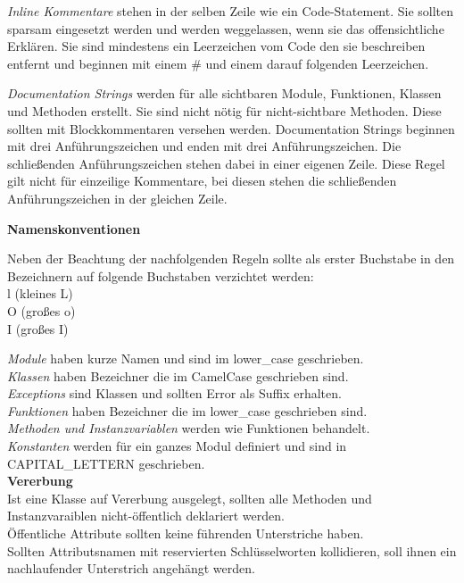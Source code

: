 \textit{Inline Kommentare} stehen in der selben Zeile wie ein Code-Statement. Sie sollten sparsam eingesetzt werden und werden weggelassen, wenn sie das offensichtliche Erklären. Sie sind mindestens ein Leerzeichen vom Code den sie beschreiben entfernt und beginnen mit einem \# und einem darauf folgenden Leerzeichen. 

\textit{Documentation Strings} werden für alle sichtbaren Module, Funktionen, Klassen und Methoden erstellt. Sie sind nicht nötig für nicht-sichtbare Methoden. Diese sollten mit Blockkommentaren versehen werden. Documentation Strings beginnen mit drei Anführungszeichen und enden mit drei Anführungszeichen. Die schließenden Anführungszeichen stehen dabei in einer eigenen Zeile. Diese Regel gilt nicht für einzeilige Kommentare, bei diesen stehen die schließenden Anführungszeichen in der gleichen Zeile.

\textbf{Namenskonventionen}\\
\begin{tabbing}
Neben \= der Beachtung der nachfolgenden Regeln sollte als erster Buchstabe in den \\
Bezeichnern auf folgende Buchstaben verzichtet werden:\\
\> l (kleines L) \\
\> O (großes o)\\
\> I (großes I)
\end{tabbing}
\textit{Module} haben kurze Namen und sind im lower\_case geschrieben. \\
\textit{Klassen} haben Bezeichner die im CamelCase geschrieben sind.\\
\textit{Exceptions} sind Klassen und sollten \glqq Error\grqq\: als Suffix erhalten.\\
\textit {Funktionen} haben Bezeichner die im lower\_case geschrieben sind.\\
\textit{Methoden und Instanzvariablen} werden wie Funktionen behandelt.\\
\textit{Konstanten} werden für ein ganzes Modul definiert und sind in CAPITAL\_LETTERN geschrieben.\\

\textbf{Vererbung}\\
Ist eine Klasse auf Vererbung ausgelegt, sollten alle Methoden und Instanzvaraiblen nicht-öffentlich deklariert werden.\\
Öffentliche Attribute sollten keine führenden Unterstriche haben.\\
Sollten Attributsnamen mit reservierten Schlüsselworten kollidieren, soll ihnen ein nachlaufender Unterstrich angehängt werden.\\


